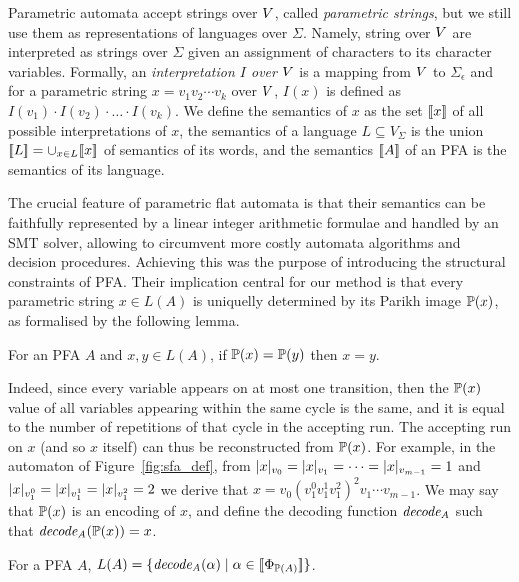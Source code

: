 \documentclass[sigplan,review,anonymous]{acmart}\settopmatter{printfolios=true,printccs=false,printacmref=false}
\begin{document}
Parametric automata accept strings over $V$, called \emph{parametric strings}, but we still use them as representations of languages over $\Sigma$. 
%
Namely, string over $V$ are interpreted as strings over $\Sigma$ given an assignment of characters to its character variables.  
%
Formally, an \emph{interpretation $I$ over $V$} is a mapping from $V$ to $\Sigma_\epsilon$ and for a parametric string $x= v_1v_2\cdots v_k$ over $V$, $I(x)$ is defined as $I(v_1)\cdot I(v_2)\cdot \ldots \cdot I(v_k)$.
%
We define the semantics of $x$ as the set $[\![x]\!]$ of all possible interpretations of $x$, the semantics of a language $L\subseteq V_\Sigma$ is the union $[\![L]\!] = \cup_{x\in L} [\![x]\!]$ of semantics of its words, and the semantics $[\![A]\!]$ of an PFA is the semantics of its language. 

The crucial feature of parametric flat automata is that their semantics can be faithfully represented by a linear integer arithmetic formulae and handled by an SMT solver, allowing to circumvent more costly automata algorithms and decision procedures. 
%
Achieving this was the purpose of introducing the structural constraints of PFA. 
Their implication central for our method is that every parametric string $x\in L(A)$ is uniquelly determined by its Parikh image $\mathbb{P}{(x)}$, as formalised by the following lemma.  

\begin{lemma}\label{lemma:parikh}
For an PFA $A$ and $x,y\in L(A)$, if $\mathbb{P}{(x)} = \mathbb{P}{(y)}$ then $x = y$. 
\end{lemma}
%
Indeed, since every variable appears on at most one transition, then the $\mathbb{P}{(x)}$ value of all variables appearing within the same cycle is the same, and it is equal to the number of repetitions of that cycle in the accepting run. 
%
The accepting run on $x$ (and so $x$ itself) can thus be reconstructed from $\mathbb{P}{(x)}$. 
%
For example, in the automaton of Figure~\ref{fig:sfa_def}, 
from $|x|_{v_0} = |x|_{v_1} = \cdots = |x|_{v_{m-1}}=1$ and $|x|_{v^0_1}=|x|_{v^1_1}=|x|_{v^2_1}=2$ we derive that $x=v_0(v^0_1v^1_1v^2_1)^2v_1\cdots v_{m-1}$. 
We may say that $\mathbb{P}{(x)}$ is an encoding of $x$, and define the decoding function $\mathit{decode_{A}}$ such that $\mathit{decode_{A}}(\mathbb{P}{(x)}) = x$.

\begin{lemma}\label{lemma:decx}
For a PFA $A$, $L(A) = \{\mathit{decode_{A}}(\alpha) \mid \alpha\in[\![\Phi_{\mathbb{P}{(A)}}]\!]\}$.
\end{lemma}
\end{document}
